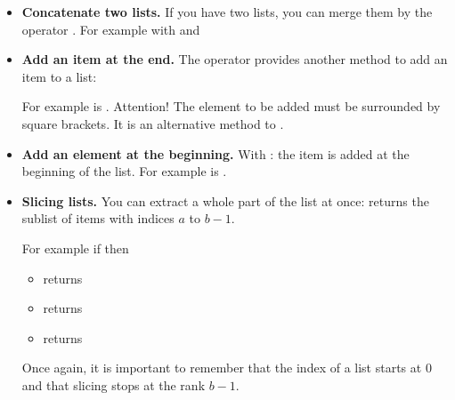 \documentclass[11pt,class=report,crop=false]{standalone}
\begin{document}
\begin{cours}[List (3)]
\sauteligne
\begin{itemize}
  \item \textbf{Concatenate two  lists.} If you have two lists, you can merge them by the operator \og{}\ci{+}\fg{}. For example with 
   and  
  
    
  \item \textbf{Add an item at the end.} The operator \og{}\ci{+}\fg{} provides another method to add an item to a list: 
  
  For example \ci{[1,2,3,4] + [5]} is \ci{[1,2,3,4,5]}.
  Attention! The element to be added must be surrounded by square brackets.   
  It is an alternative method to .
  
  \item \textbf{Add an element at the beginning.} With : 
  the item is added at the beginning of the list.
  For example \ci{[5] + [1,2,3,4]} is \ci{[5,1,2,3,4]}. 
  
  \item \textbf{Slicing lists.} You can extract a whole part of the list at once:  returns the sublist of items with indices $a$ to $b-1$.
  
  \smallskip
  
  
    For example if  then  
  \begin{itemize}
    \item {} returns \ci{["B","C","D"]}
    \item {} returns \ci{["A","B"]}
    \item {} returns \ci{["E","F","G"]}
  \end{itemize} 
  Once again, it is important to remember that the index of a list starts at $0$ and that slicing  stops at the rank $b-1$.
   
\end{itemize}
\end{cours}

\end{document}
